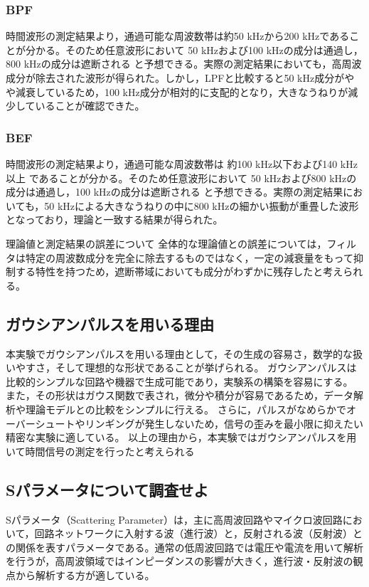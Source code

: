 \documentclass[11pt,dvipdfmx]{jarticle}
\begin{document}
\subsubsection{BPF}
時間波形の測定結果より，通過可能な周波数帯は約50 kHzから200 kHzであることが分かる。そのため任意波形において 50 kHzおよび100 kHzの成分は通過し，800 kHzの成分は遮断される と予想できる。実際の測定結果においても，高周波成分が除去された波形が得られた。しかし，LPFと比較すると50 kHz成分がやや減衰しているため，100 kHz成分が相対的に支配的となり，大きなうねりが減少していることが確認できた。
\subsubsection{BEF}
時間波形の測定結果より，通過可能な周波数帯は 約100 kHz以下および140 kHz以上 であることが分かる。そのため任意波形において 50 kHzおよび800 kHzの成分は通過し，100 kHzの成分は遮断される と予想できる。実際の測定結果においても，50 kHzによる大きなうねりの中に800 kHzの細かい振動が重畳した波形となっており，理論と一致する結果が得られた。

理論値と測定結果の誤差について
全体的な理論値との誤差については，フィルタは特定の周波数成分を完全に除去するものではなく，一定の減衰量をもって抑制する特性を持つため，遮断帯域においても成分がわずかに残存したと考えられる。
\subsection{ガウシアンパルスを用いる理由}
本実験でガウシアンパルスを用いる理由として，その生成の容易さ，数学的な扱いやすさ，そして理想的な形状であることが挙げられる。
ガウシアンパルスは比較的シンプルな回路や機器で生成可能であり，実験系の構築を容易にする。
また，その形状はガウス関数で表され，微分や積分が容易であるため，データ解析や理論モデルとの比較をシンプルに行える。
さらに，パルスがなめらかでオーバーシュートやリンギングが発生しないため，信号の歪みを最小限に抑えたい精密な実験に適している。
以上の理由から，本実験ではガウシアンパルスを用いて時間信号の測定を行ったと考えられる

\subsection{Sパラメータについて調査せよ}

Sパラメータ（Scattering Parameter）は，主に高周波回路やマイクロ波回路において，回路ネットワークに入射する波（進行波）と，反射される波（反射波）との関係を表すパラメータである。通常の低周波回路では電圧や電流を用いて解析を行うが，高周波領域ではインピーダンスの影響が大きく，進行波・反射波の観点から解析する方が適している。
\end{document}
